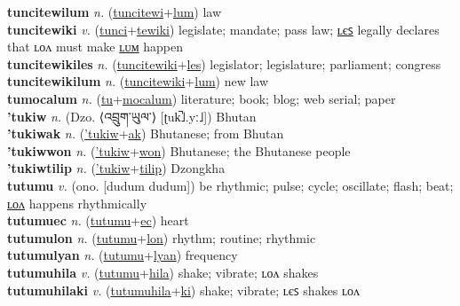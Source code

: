 \textbf{tuncitewilum} \textit{n.} (\hyperref[tuncitewi]{tuncitewi}+\hyperref[lum]{lum})
law \label{tuncitewilum} \\
\textbf{tuncitewiki} \textit{v.} (\hyperref[tunci]{tunci}+\hyperref[tewiki]{tewiki})
legislate; mandate; pass law; \hyperref[tuncitewikiles]{ʟєꜱ} legally declares that ʟᴏᴧ must make \hyperref[tuncitewikilum]{ʟᴜᴍ} happen \label{tuncitewiki} \\
\textbf{tuncitewikiles} \textit{n.} (\hyperref[tuncitewiki]{tuncitewiki}+\hyperref[les]{les})
legislator; legislature; parliament; congress \label{tuncitewikiles} \\
\textbf{tuncitewikilum} \textit{n.} (\hyperref[tuncitewiki]{tuncitewiki}+\hyperref[lum]{lum})
new law \label{tuncitewikilum} \\
\textbf{tumocalum} \textit{n.} (\hyperref[tu]{tu}+\hyperref[mocalum]{mocalum})
literature; book; blog; web serial; paper \label{tumocalum} \\
\textbf{'tukiw} \textit{n.} (Dzo. ⟨འབྲུག་ཡུལ་⟩ [ʈuk̚˩.yː˩])
Bhutan \label{'tukiw} \\
\textbf{'tukiwak} \textit{n.} (\hyperref['tukiw]{'tukiw}+\hyperref[ak]{ak})
Bhutanese; from Bhutan \label{'tukiwak} \\
\textbf{'tukiwwon} \textit{n.} (\hyperref['tukiw]{'tukiw}+\hyperref[won]{won})
Bhutanese; the Bhutanese people \label{'tukiwwon} \\
\textbf{'tukiwtilip} \textit{n.} (\hyperref['tukiw]{'tukiw}+\hyperref[tilip]{tilip})
Dzongkha \label{'tukiwtilip} \\
\textbf{tutumu} \textit{v.} (ono. [dudum dudum])
be rhythmic; pulse; cycle; oscillate; flash; beat; \hyperref[tutumulon]{ʟᴏᴧ} happens rhythmically \label{tutumu} \\
\textbf{tutumuec} \textit{n.} (\hyperref[tutumu]{tutumu}+\hyperref[ec]{ec})
heart \label{tutumuec} \\
\textbf{tutumulon} \textit{n.} (\hyperref[tutumu]{tutumu}+\hyperref[lon]{lon})
rhythm; routine; rhythmic \label{tutumulon} \\
\textbf{tutumulyan} \textit{n.} (\hyperref[tutumu]{tutumu}+\hyperref[lyan]{lyan})
frequency \label{tutumulyan} \\
\textbf{tutumuhila} \textit{v.} (\hyperref[tutumu]{tutumu}+\hyperref[hila]{hila})
shake; vibrate; ʟᴏᴧ shakes \label{tutumuhila} \\
\textbf{tutumuhilaki} \textit{v.} (\hyperref[tutumuhila]{tutumuhila}+\hyperref[ki]{ki})
shake; vibrate; ʟєꜱ shakes ʟᴏᴧ \label{tutumuhilaki} \\
